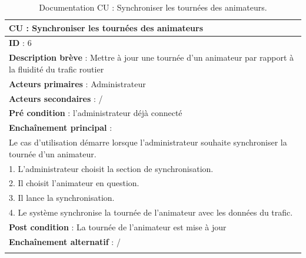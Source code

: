 \renewcommand{\arraystretch}{1.5}
\begin{xltabular}{\linewidth}{|X|}
    \hline
    \textbf{CU} : Synchroniser les tournées des animateurs      \\\hline
    \textbf{ID} :  6    \\\hline
    \textbf{Description brève} : Mettre à jour une tournée d'un animateur par rapport à la fluidité du trafic routier     \\\hline
    \textbf{Acteurs primaires} :  Administrateur    \\\hline
    \textbf{Acteurs secondaires} :  /    \\\hline
    \textbf{Pré condition} :  l'administrateur déjà connecté   \\\hline
    \textbf{Enchaînement principal} : \\
    Le cas d'utilisation démarre lorsque l'administrateur souhaite synchroniser la tournée d'un animateur. \\
    1. L'administrateur choisit la section de synchronisation. \\
    2. Il choisit l'animateur en question. \\
    3. Il lance la synchronisation. \\
    4. Le système synchronise la tournée de l'animateur avec les données du trafic.
    \\\hline
    \textbf{Post condition} : La tournée de l'animateur est mise à jour     \\\hline
    \textbf{Enchaînement alternatif} :   /   \\\hline
    
    \caption{Documentation CU : Synchroniser les tournées des animateurs.}
    \label{tab:cu-specs2}
\end{xltabular}
\FloatBarrier


